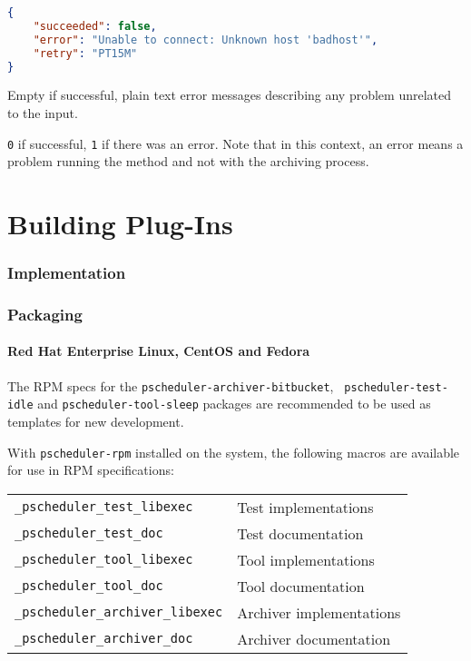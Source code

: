 \documentclass[10pt,titlepage]{article}
\begin{document}
\example
\begin{lstlisting}[language=json,firstnumber=1]
{
    "succeeded": false,
    "error": "Unable to connect: Unknown host 'badhost'",
    "retry": "PT15M"
}
\end{lstlisting}


 Empty if successful, plain text error
messages describing any problem unrelated to the input.

 {\tt 0} if successful, {\tt 1} if there was
an error.  Note that in this context, an error means a problem running
the method and not with the archiving process.





\part{Building Plug-Ins}

\section{Implementation}

\section{Packaging}

\subsection{Red Hat Enterprise Linux, CentOS and Fedora}

The RPM specs for the {\tt pscheduler-archiver-bitbucket}, {\tt
  pscheduler-test-idle} and {\tt pscheduler-tool-sleep} packages are
recommended to be used as templates for new development.

With {\tt pscheduler-rpm} installed on the system, the following
macros are available for use in RPM specifications:
\begin{center}
  \begin{tabular}{ll} 
    {\tt _pscheduler_test_libexec} & Test implementations \\
    {\tt _pscheduler_test_doc} & Test documentation \\
    {\tt _pscheduler_tool_libexec} & Tool implementations \\
    {\tt _pscheduler_tool_doc} & Tool documentation \\
    {\tt _pscheduler_archiver_libexec} & Archiver implementations \\
    {\tt _pscheduler_archiver_doc} & Archiver documentation \\
  \end{tabular}
\end{center}
\end{document}
